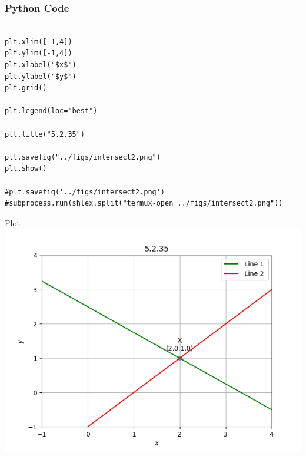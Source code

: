 \documentclass{beamer}
\begin{document}
\begin{frame}[fragile]
    \frametitle{Python Code }
    \begin{lstlisting}

plt.xlim([-1,4])
plt.ylim([-1,4])
plt.xlabel("$x$")
plt.ylabel("$y$")
plt.grid()

plt.legend(loc="best")

plt.title("5.2.35")

plt.savefig("../figs/intersect2.png")
plt.show()

#plt.savefig('../figs/intersect2.png')
#subprocess.run(shlex.split("termux-open ../figs/intersect2.png"))

    \end{lstlisting}
\end{frame}

\begin{frame}{Plot}
    \centering
    \includegraphics[width=\columnwidth, height=0.8\textheight, keepaspectratio]{../figs/intersect1.png}   
\end{frame}
\end{document}
